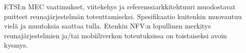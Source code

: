 ETSI:n MEC vaatimukset, viitekehys ja referenssiarkkitehtuuri muodostavat puitteet reunajärjestelmän toteuttamiseksi.
Spesifikaatio kuitenkin muovautuu vielä ja muutoksia saattaa tulla. Etenkin NFV:n lopullinen merkitys reunajärjestelmien ja/tai mobiiliverkon toteutuksissa on toistaiseksi avoin kysmys.
